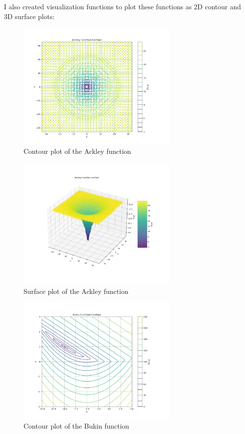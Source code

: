 \documentclass{article}
\begin{document}
I also created visualization functions to plot these functions as 2D contour and 3D surface plots:

\begin{figure}[H]
\centering
\includegraphics[width=0.7\textwidth]{Ackley_Function_Contour_contour.png}
\caption{Contour plot of the Ackley function}
\label{fig:ackley_contour}
\end{figure}

\begin{figure}[H]
\centering
\includegraphics[width=0.7\textwidth]{Ackley_Function_Surface_surface.png}
\caption{Surface plot of the Ackley function}
\label{fig:ackley_surface}
\end{figure}

\begin{figure}[H]
\centering
\includegraphics[width=0.7\textwidth]{Bukin_Function_Contour_contour.png}
\caption{Contour plot of the Bukin function}
\label{fig:bukin_contour}
\end{figure}
\end{document}
